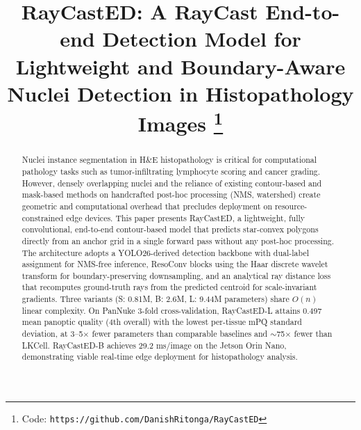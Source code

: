 \documentclass[conference]{IEEEtran}
\begin{document}
\title{RayCastED: A RayCast End-to-end Detection Model for Lightweight and Boundary-Aware Nuclei Detection in Histopathology Images%
\thanks{Code: \texttt{https://github.com/DanishRitonga/RayCastED}}}

\author{
\and
{}
\and
{}
}

\maketitle

\begin{abstract}
Nuclei instance segmentation in H\&E histopathology is critical for computational pathology tasks such as tumor-infiltrating lymphocyte scoring and cancer grading. However, densely overlapping nuclei and the reliance of existing contour-based and mask-based methods on handcrafted post-hoc processing (NMS, watershed) create geometric and computational overhead that precludes deployment on resource-constrained edge devices. This paper presents RayCastED, a lightweight, fully convolutional, end-to-end contour-based model that predicts star-convex polygons directly from an anchor grid in a single forward pass without any post-hoc processing. The architecture adopts a YOLO26-derived detection backbone with dual-label assignment for NMS-free inference, ResoConv blocks using the Haar discrete wavelet transform for boundary-preserving downsampling, and an analytical ray distance loss that recomputes ground-truth rays from the predicted centroid for scale-invariant gradients. Three variants (S: 0.81M, B: 2.6M, L: 9.44M parameters) share $O(n)$ linear complexity. On PanNuke 3-fold cross-validation, RayCastED-L attains 0.497 mean panoptic quality (4th overall) with the lowest per-tissue mPQ standard deviation, at 3--5$\times$ fewer parameters than comparable baselines and $\sim$75$\times$ fewer than LKCell. RayCastED-B achieves 29.2 ms/image on the Jetson Orin Nano, demonstrating viable real-time edge deployment for histopathology analysis.
\end{abstract}
\end{document}
